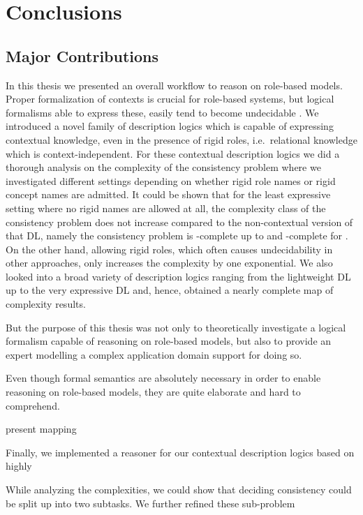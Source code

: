 \chapter{Conclusions}
\label{cha:conclusions}


\section{Major Contributions}
\label{sec:major-contributions}

In this thesis we presented an overall workflow to reason on role-based models. Proper formalization
of contexts is crucial for role-based systems, but logical formalisms able to express these, easily
tend to become undecidable .  We introduced a novel family of description logics which is capable of
expressing contextual knowledge, even in the presence of rigid roles, i.e.\ relational knowledge
which is context-independent.  For these contextual description logics we did a thorough analysis on
the complexity of the consistency problem where we investigated different settings depending on
whether rigid role names or rigid concept names are admitted. It could be shown that for the least
expressive setting where no rigid names are allowed at all, the complexity class of the consistency
problem does not increase compared to the non-contextual version of that DL, namely the consistency
problem is \ExpTime-complete up to \SHOQSHOQ and \NExpTime-complete for \SHOIQSHOIQ. On the other
hand, allowing rigid roles, which often causes undecidability in other approaches, only increases
the complexity by one exponential.
%
We also looked into a broad variety of description logics
ranging from the lightweight DL \EL up to the very expressive DL \SHOIQ and, hence, obtained a
nearly complete map of complexity results.

But the purpose of this thesis was not only to theoretically investigate a logical formalism capable
of reasoning on role-based models, but also to provide an expert modelling a complex application
domain support for doing so.

Even though formal semantics are absolutely necessary in order to enable reasoning on role-based
models, they are quite elaborate and hard to comprehend.

present mapping



Finally, we implemented a reasoner for our contextual description logics based on highly 

While analyzing the complexities, we could show that deciding consistency could be split up into two
subtasks. We further refined these sub-problem 




